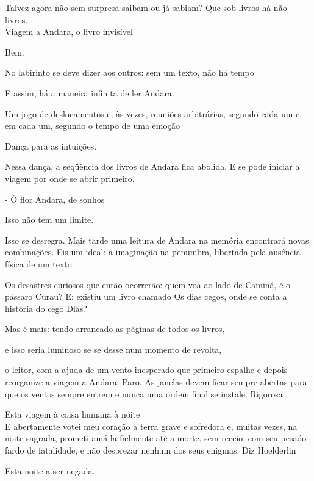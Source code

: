 Talvez agora não sem surpresa saibam ou já sabiam? Que sob livros há não
livros.\\

Viagem a Andara, o livro invisível

\pagebreak

Bem.

No labirinto se deve dizer aos outros: sem um texto, não há tempo

E assim, há a maneira infinita de ler Andara.

Um jogo de deslocamentos e, às vezes, reuniões arbitrárias, segundo cada
um e, em cada um, segundo o tempo de uma emoção

Dança para as intuições.

\pagebreak

Nessa dança, a seqüência dos livros de Andara fica abolida. E se pode
iniciar a viagem por onde se abrir primeiro.

- Ó flor Andara, de sonhos

Isso não tem um limite.

Isso se desregra. Mais tarde uma leitura de Andara na memória encontrará
novas combinações. Eis um ideal: a imaginação na penumbra, libertada
pela ausência física de um texto

Os desastres curiosos que então ocorrerão: quem voa ao lado de Caminá, é
o pássaro Curau? E: existiu um livro chamado Os dias cegos, onde se
conta a história do cego Dias?

Mas é mais: tendo arrancado as páginas de todos os livros,

e isso seria luminoso se se desse num momento de revolta,

o leitor, com a ajuda de um vento inesperado que primeiro espalhe e
depois reorganize a viagem a Andara. Paro. As janelas devem ficar sempre
abertas para que os ventos sempre entrem e nunca uma ordem final se
instale. Rigorosa.

\pagebreak

\clearpage
\thispagestyle{empty}

\movetooddpage

Esta viagem à coisa humana à noite\\

E abertamente votei meu coração à terra grave e sofredora e, muitas
vezes, na noite sagrada, prometi amá-la fielmente até a morte, sem
receio, com seu pesado fardo de fatalidade, e não desprezar nenhum dos
seus enigmas. Diz Hoelderlin

Esta noite a ser negada.

